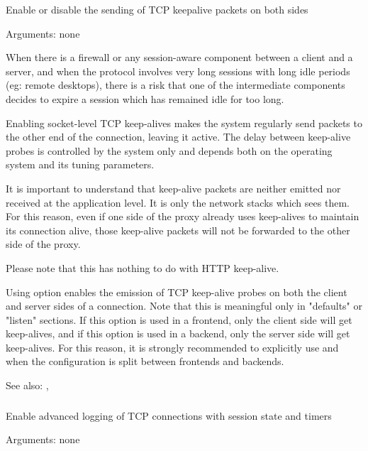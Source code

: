   Enable or disable the sending of TCP keepalive packets on both sides


  Arguments: none

  When there is a firewall or any session-aware component between a client and
  a server, and when the protocol involves very long sessions with long idle
  periods (eg: remote desktops), there is a risk that one of the intermediate
  components decides to expire a session which has remained idle for too long.

  Enabling socket-level TCP keep-alives makes the system regularly send packets
  to the other end of the connection, leaving it active. The delay between
  keep-alive probes is controlled by the system only and depends both on the
  operating system and its tuning parameters.

  It is important to understand that keep-alive packets are neither emitted nor
  received at the application level. It is only the network stacks which sees
  them. For this reason, even if one side of the proxy already uses keep-alives
  to maintain its connection alive, those keep-alive packets will not be
  forwarded to the other side of the proxy.

  Please note that this has nothing to do with HTTP keep-alive.

  Using option  enables the emission of TCP keep-alive probes on both
  the client and server sides of a connection. Note that this is meaningful
  only in "defaults" or "listen" sections. If this option is used in a
  frontend, only the client side will get keep-alives, and if this option is
  used in a backend, only the server side will get keep-alives. For this
  reason, it is strongly recommended to explicitly use  and
   when the configuration is split between frontends and
  backends.


See also: , 

\subsubsection[tcplog]{}


  Enable advanced logging of TCP connections with session state and timers


  Arguments: none

